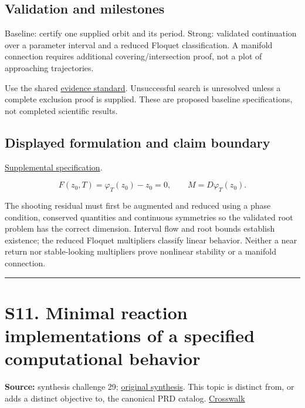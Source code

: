 \documentclass[
  11pt,
]{article}
\begin{document}
\subsection{Validation and milestones}

Baseline: certify one supplied orbit and its period. Strong: validated
continuation over a parameter interval and a reduced Floquet
classification. A manifold connection requires additional
covering/intersection proof, not a plot of approaching trajectories.

Use the shared
\href{https://github.com/rick-stevens-ai/Pure-Thought/blob/main/reviews/EVIDENCE-STANDARD.md}{evidence
standard}. Unsuccessful search is unresolved unless a complete exclusion
proof is supplied. These are proposed baseline specifications, not
completed scientific results.

\subsection{Displayed formulation and claim boundary}

\href{https://github.com/rick-stevens-ai/Pure-Thought/blob/main/supplemental/S10.md}{Supplemental
specification}.

\[F(z_0,T)=\varphi_T(z_0)-z_0=0,\qquad
M=D\varphi_T(z_0).\]

The shooting residual must first be augmented and reduced using a phase
condition, conserved quantities and continuous symmetries so the
validated root problem has the correct dimension. Interval flow and root
bounds establish existence; the reduced Floquet multipliers classify
linear behavior. Neither a near return nor stable-looking multipliers
prove nonlinear stability or a manifold connection.

\begin{center}\rule{0.5\linewidth}{0.5pt}\end{center}

\section{S11. Minimal reaction implementations of a specified
computational behavior}

\textbf{Source:} synthesis challenge 29;
\href{https://github.com/rick-stevens-ai/Pure-Thought/blob/main/NOTES/30-Most-Compelling-Pure-Thought-AI-Challenges.md}{original
synthesis}. This topic is distinct from, or adds a distinct objective
to, the canonical PRD catalog.
\href{https://github.com/rick-stevens-ai/Pure-Thought/blob/main/reviews/SYNTHESIS-CROSSWALK.md}{Crosswalk}
\end{document}
